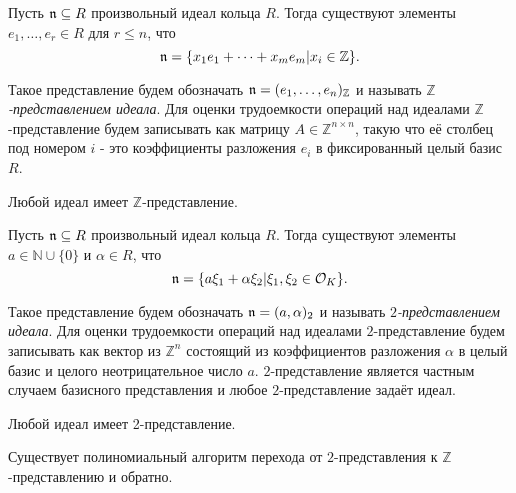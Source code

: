 \documentclass[_00_autoref.tex]{subfiles}
\begin{document}
\begin{definition}
    Пусть $\mathfrak{n} \subseteq R$ произвольный идеал кольца $R$.
    Тогда существуют элементы $e_1, \dots, e_r \in R$ для $r \leq n$, что
    \begin{equation*}
        \mathfrak{n} = \{x_1 e_1 + \dots + x_m e_m | x_i \in \mathbb{Z}\}.
    \end{equation*}

    Такое представление будем обозначать $\mathfrak{n} = (e_1, \dots, e_n)_{\mathbb{Z}}$ и называть \emph{$\mathbb{Z}$-представлением идеала}.
    Для оценки трудоемкости операций над идеалами $\mathbb{Z}$-представление будем записывать как матрицу $A \in \mathbb{\mathbb{Z}}^{n \times n}$, такую что её столбец под номером $i$ - это коэффициенты разложения $e_i$ в фиксированный целый базис $R$.
\end{definition}

\begin{statement}
    Любой идеал имеет $\mathbb{Z}$-представление.
\end{statement}

\begin{definition}
    Пусть $\mathfrak{n} \subseteq R$ произвольный идеал кольца $R$.
    Тогда существуют элементы $a \in \mathbb{N} \cup \{0\}$ и $\alpha \in R$, что 
    \begin{equation*}
        \mathfrak{n} = \{a \xi_1 + \alpha \xi_2 | \xi_1, \xi_2 \in \mathcal{O}_K\}.
    \end{equation*}

    Такое представление будем обозначать $\mathfrak{n} = (a, \alpha)_2$ и называть \emph{$2$-представлением идеала}.
    Для оценки трудоемкости операций над идеалами $2$-представление будем записывать как вектор из $\mathbb{Z}^n$ состоящий из коэффициентов разложения $\alpha$ в целый базис и целого неотрицательное число $a$.
    $2$-представление является частным случаем базисного представления и любое $2$-представление задаёт идеал.
\end{definition}

\begin{statement}
    Любой идеал имеет 2-представление.
\end{statement}

\begin{statement}
    Существует полиномиальный алгоритм перехода от $2$-представления к $\mathbb{Z}$-представлению и обратно.
\end{statement}
\end{document}
